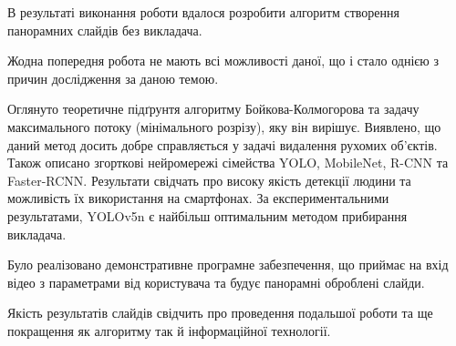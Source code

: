 В результаті виконання роботи вдалося
розробити алгоритм створення панорамних слайдів без викладача.


Жодна попередня робота не мають всі можливості даної, що і стало однією 
з причин дослідження за даною темою.


Оглянуто теоретичне підґрунтя алгоритму Бойкова-Колмогорова та задачу
максимального потоку (мінімального розрізу), яку він вирішує. Виявлено, що 
даний метод досить добре справляється у задачі видалення рухомих об'єктів.
Також описано згорткові нейромережі сімейства YOLO, MobileNet, R-CNN та 
Faster-RCNN. Результати свідчать про високу якість детекції людини та можливість
їх використання на смартфонах. За експериментальними результатами, YOLOv5n є найбільш оптимальним
методом прибирання викладача.  


Було реалізовано демонстративне програмне забезпечення,
що приймає на вхід відео з параметрами від користувача та 
будує панорамні оброблені слайди. 


Якість результатів слайдів свідчить про проведення подальшої роботи та 
ще покращення як алгоритму так й інформаційної технології.
\clearpage